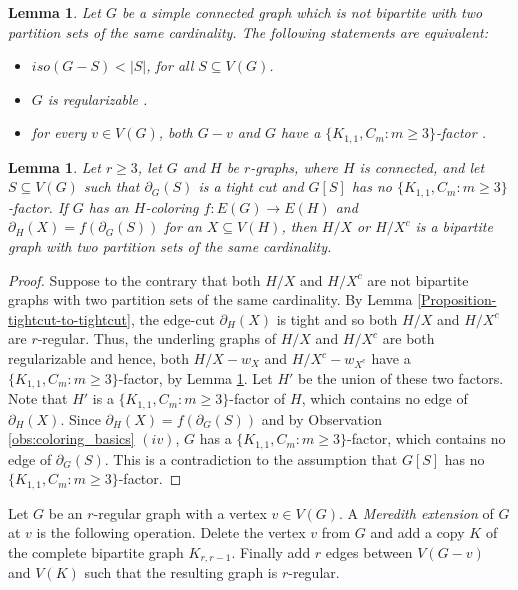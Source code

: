 \documentclass[a4paper,11pt]{article}
\newtheorem{lem}[defi]{Lemma}
\theoremstyle{remark}
\begin{document}
\begin{lem}\label{Lemma-regular=factor}
	Let $ G $ be a simple connected graph which is not bipartite with two partition sets of the same cardinality. The following statements are equivalent:
	\begin{itemize}
		\item  $ iso(G-S) < |S|  $, for all $ S \subseteq V(G)$.
		\item   $ G $ is regularizable \cite{Berge-Vergnas-1978}.
		\item for every $ v\in V(G) $, both $ G-v $ and $ G $ have a $ \{K_{1,1}, C_m\colon m\geq3\} $-factor \cite{Pulleyblank-1979}.
	\end{itemize}
\end{lem}


\begin{lem}\label{Lemma-contract-H-class1}
	Let $r\geq 3$, let $ G$ and $ H $ be $ r $-graphs, where $H$ is connected, and let $S \subseteq V(G) $ such that $ \partial_G(S) $ is a tight cut and $ G[S] $ has no $ \{K_{1,1}, C_m:m\geq3\} $-factor. If $ G $ has an $ H $-coloring $f\colon E(G)\to E(H)$
	and $\partial_H(X)=f(\partial_G(S))$ for an $X \subseteq V(H)$, then   $H/X$ or $H/X^c$ is a bipartite graph with two partition sets of the same cardinality.
\end{lem}
\begin{proof}
	Suppose to the contrary that both $H/X$ and $H/X^c$ are not bipartite graphs with two partition sets of the same cardinality.   By Lemma \ref{Proposition-tightcut-to-tightcut},  the edge-cut $\partial_H(X)$ is tight and so both $H/X$ and $H/X^c$ are $ r $-regular. Thus, the underling graphs of $H/X$ and $H/X^c$ are both regularizable and hence,  both $H/X-w_X$ and $H/X^c-w_{X^c}$ have a $ \{K_{1,1}, C_m:m\geq3\} $-factor, by Lemma \ref{Lemma-regular=factor}. Let $ H' $ be the union of these two factors. Note that $ H' $ is a $ \{K_{1,1}, C_m:m\geq3\} $-factor of $ H $, which contains no edge of $ \partial_H(X) $. Since $\partial_H(X)=f(\partial_G(S))$ and by Observation  \ref{obs:coloring_basics} $ (iv) $, $ G $ has a $ \{K_{1,1}, C_m:m\geq3\} $-factor, which contains no edge of $ \partial_G(S) $. This is a contradiction to the assumption that $ G[S] $ has no $ \{K_{1,1}, C_m:m\geq3\} $-factor.
\end{proof}

	Let  $G$ be an $r$-regular graph with a vertex $v\in V(G)$. A \emph{Meredith extension} of $ G $ at $ v $ is the following operation. Delete the vertex $ v $ from $ G $ and add a copy $K$ of the complete bipartite graph $ K_{r,r-1} $. Finally add $ r $ edges between $ V(G-v)$ and $ V(K) $ such that the resulting graph is $ r $-regular.
\end{document}
